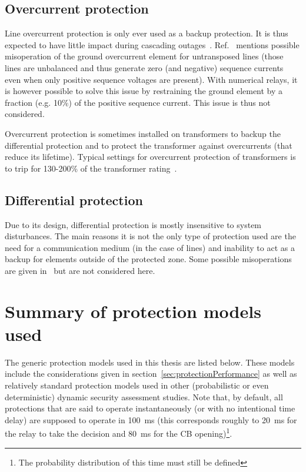 \subsection{Overcurrent protection}

Line overcurrent protection is only ever used as a backup protection. It is thus expected to have little impact during cascading outages~\cite{PSRCreportProtectionMisop}. Ref.~\cite{PSRCreportProtectionMisop} mentions possible misoperation of the ground overcurrent element for untransposed lines (those lines are unbalanced and thus generate zero (and negative) sequence currents even when only positive sequence voltages are present). With numerical relays, it is however possible to solve this issue by restraining the ground element by a fraction (e.g. 10\%) of the positive sequence current. This issue is thus not considered.

Overcurrent protection is sometimes installed on transformers to backup the differential protection and to protect the transformer against overcurrents (that reduce its lifetime). Typical settings for overcurrent protection of transformers is to trip for 130-200\% of the transformer rating~\cite{ENTSOEdefencePlan}.

\subsection{Differential protection}

Due to its design, differential protection is mostly insensitive to system disturbances. The main reasons it is not the only type of protection used are the need for a communication medium (in the case of lines) and inability to act as a backup for elements outside of the protected zone. Some possible misoperations are given in~\cite{PSRCreportProtectionMisop} but are not considered here.



\section{Summary of protection models used}
\label{sec:consideredProtections}

The generic protection models used in this thesis are listed below. These models include the considerations given in section~\ref{sec:protectionPerformance} as well as relatively standard protection models used in other (probabilistic or even deterministic) dynamic security assessment studies. Note that, by default, all protections that are said to operate instantaneously (or with no intentional time delay) are supposed to operate in 100~ms (this corresponds roughly to 20~ms for the relay to take the decision and 80~ms for the CB opening)\footnote{The probability distribution of this time must still be defined}.


